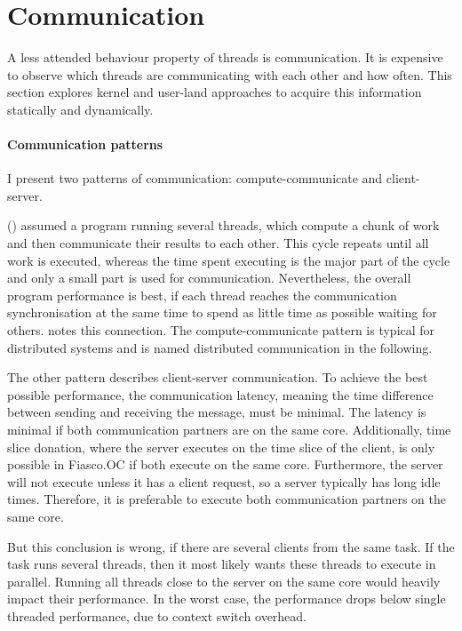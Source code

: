 \section{Communication}
\label{design:comm}

A less attended behaviour property of threads is communication.
It is expensive to observe which threads are communicating with each other and
how often.
This section explores kernel and user-land approaches to acquire this
information statically and dynamically.


\paragraph{Communication patterns}
I present two patterns of communication: compute-communicate and client-server.

\citeauthor{hofmeyr_load_2010} (\cite{hofmeyr_load_2010}) assumed a program running several threads, which
compute a chunk of work and then communicate their results to each other.
This cycle repeats until all work is executed, whereas the time spent executing
is the major part of the cycle and only a small part is used for communication.
Nevertheless, the overall program performance is best, if each thread reaches
the communication synchronisation at the same time to spend as little time as
possible waiting for others.
\cite{hofmeyr_load_2010} notes this connection.
The compute-communicate pattern is typical for distributed systems and is named
distributed communication in the following.

The other pattern describes client-server communication.
To achieve the best possible performance, the communication latency, meaning
the time difference between sending and receiving the message, must be minimal.
The latency is minimal if both communication partners are on the same core.
Additionally, time slice donation, where the server executes on the time slice
of the client, is only possible in Fiasco.OC if both execute on the same core.
Furthermore, the server will not execute unless it has a client request, so a
server typically has long idle times.
Therefore, it is preferable to execute both communication partners on the same
core.

But this conclusion is wrong, if there are several clients from the same task.
If the task runs several threads, then it most likely wants these threads to
execute in parallel.
Running all threads close to the server on the same core would heavily impact
their performance.
In the worst case, the performance drops below single threaded performance, due
to context switch overhead.

